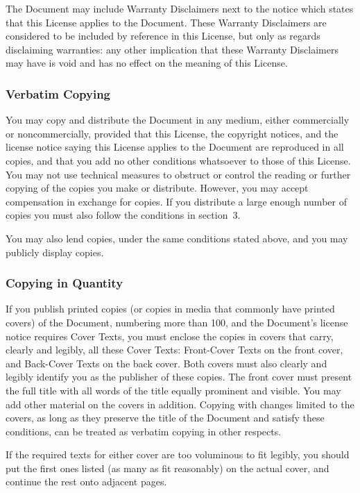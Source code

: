 The Document may include Warranty Disclaimers next to the notice which states
that this License applies to the Document.  These Warranty Disclaimers are
considered to be included by reference in this License, but only as regards
disclaiming warranties: any other implication that these Warranty Disclaimers
may have is void and has no effect on the meaning of this License.


\subsubsection{Verbatim Copying}

You may copy and distribute the Document in any medium, either commercially or
noncommercially, provided that this License, the copyright notices, and the
license notice saying this License applies to the Document are reproduced in
all copies, and that you add no other conditions whatsoever to those of this
License.  You may not use technical measures to obstruct or control the reading
or further copying of the copies you make or distribute.  However, you may
accept compensation in exchange for copies.  If you distribute a large enough
number of copies you must also follow the conditions in section~3.

You may also lend copies, under the same conditions stated above, and you may
publicly display copies.


\subsubsection{Copying in Quantity}

If you publish printed copies (or copies in media that commonly have printed
covers) of the Document, numbering more than 100, and the Document's license
notice requires Cover Texts, you must enclose the copies in covers that carry,
clearly and legibly, all these Cover Texts: Front-Cover Texts on the front
cover, and Back-Cover Texts on the back cover.  Both covers must also clearly
and legibly identify you as the publisher of these copies.  The front cover
must present the full title with all words of the title equally prominent and
visible.  You may add other material on the covers in addition. Copying with
changes limited to the covers, as long as they preserve the title of the
Document and satisfy these conditions, can be treated as verbatim copying in
other respects.

If the required texts for either cover are too voluminous to fit legibly, you
should put the first ones listed (as many as fit reasonably) on the actual
cover, and continue the rest onto adjacent pages.

